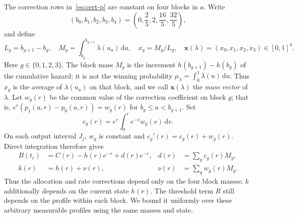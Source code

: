 \documentclass[11pt]{article}
\theoremstyle{definition}
\theoremstyle{remark}
\newcommand{\dd}{\,\mathrm d}
\begin{document}
The correction rows in~\eqref{eq:cert-p} are constant on four blocks in $a$.
Write
\begin{equation}\label{eq:cert-blocks}
 (b_0,b_1,b_2,b_3,b_4)
 =\left(0,\frac25,2,\frac{16}5,\frac{32}5\right),
\end{equation}
and define
\begin{equation}\label{eq:cert-mass-map}
 L_g=b_{g+1}-b_g,\quad
 M_g=\int_{b_g}^{b_{g+1}}\lambda(u_a)\dd a,\quad
 x_g=M_g/L_g,\quad \mathbf x(\lambda)=(x_0,x_1,x_2,x_3)\in[0,1]^4.
\end{equation}
Here $g\in\{0,1,2,3\}$.  The block mass $M_g$ is the increment
$h(b_{g+1})-h(b_g)$ of the cumulative hazard; it is not the winning
probability $\mu_\lambda=\int_0^1\lambda(u)\dd u$.
Thus $x_g$ is the average of $\lambda(u_a)$ on that block, and we call $\mathbf x(\lambda)$ the \emph{mass vector} of $\lambda$.
Let $w_g(r)$ be the common value of the correction coefficient on block $g$;
that is,
$e^r(p_1(a,r)-p_0(a,r))=w_g(r)$ for $b_g\le a<b_{g+1}$.
Set
\begin{equation}\label{eq:cert-c-coeff}
 c_g(r)=e^r\int_0^r e^{-v}w_g(v)\dd v.
\end{equation}
On each output interval $J_j$, $w_g$ is constant and
$c_g'(r)=c_g(r)+w_g(r)$.  Direct integration therefore gives
\begin{align}
 B(t_r)&=C(r)-h(r)e^{-r}+d(r)e^{-r},&
 d(r)&=\sum_g c_g(r)M_g,\label{eq:cert-dzk}\\
 k(r)&=h(r)+\nu(r),& \nu(r)&=\sum_g w_g(r)M_g.
 \label{eq:cert-zk}
\end{align}
Thus the allocation and rate corrections depend only on the four
block masses; $k$ additionally depends on the current state $h(r)$.
The threshold term $R$ still depends on the profile within each block.
We bound it uniformly over these arbitrary measurable profiles using
the same masses and state.
\end{document}
